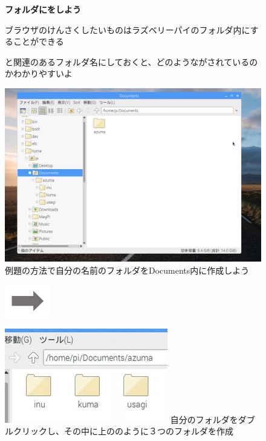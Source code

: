 \begin{figure}[t]
  \flushleft
  {\bfseries
    フォルダにをしよう}

  ブラウザのけんさくしたいものはラズベリーパイのフォルダ内にすることができる

  と関連のあるフォルダ名にしておくと、どのようながされているのかわかりやすいよ

  \begin{minipage}{0.4\textwidth}
    \includegraphics[width=\linewidth]{text01-img/textbook-img093.png}
     例題の方法で自分の名前のフォルダをDocuments内に作成しよう
  \end{minipage}
  \includegraphics[width=2cm]{text01-img/textbook-img073.png}
  \begin{minipage}{0.4\textwidth}
    \includegraphics[width=\linewidth]{text01-img/textbook-img094.jpg}
     自分のフォルダをダブルクリックし、その中に上ののように３つのフォルダを作成
  \end{minipage}


\end{figure}
